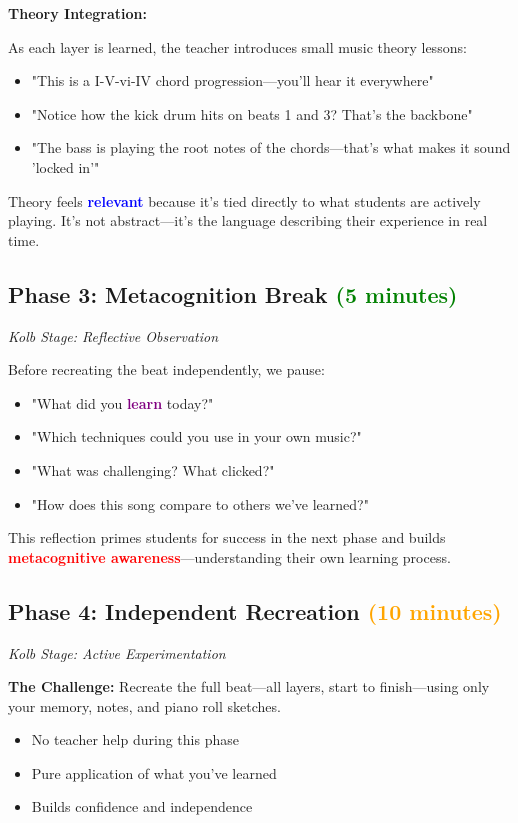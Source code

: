 \documentclass[11pt,letterpaper]{article}
\newcommand{\purple}[1]{\textcolor{purple}{\textbf{#1}}}
\newcommand{\bluepurple}[1]{\textcolor{blue}{\textbf{#1}}}
\newcommand{\redtext}[1]{\textcolor{red}{\textbf{#1}}}
\begin{document}
\textbf{Theory Integration:}

As each layer is learned, the teacher introduces small music theory lessons:
\begin{itemize}[leftmargin=*]
\item "This is a I-V-vi-IV chord progression—you'll hear it everywhere"
\item "Notice how the kick drum hits on beats 1 and 3? That's the backbone"
\item "The bass is playing the root notes of the chords—that's what makes it sound 'locked in'"
\end{itemize}

Theory feels \bluepurple{relevant} because it's tied directly to what students are actively playing. It's not abstract—it's the language describing their experience in real time.

\subsection*{Phase 3: Metacognition Break \texorpdfstring{\textcolor{green}{(5 minutes)}}{(5 minutes)}}
\textit{Kolb Stage: Reflective Observation}

Before recreating the beat independently, we pause:

\begin{itemize}[leftmargin=*]
\item "What did you \purple{learn} today?"
\item "Which techniques could you use in your own music?"
\item "What was challenging? What clicked?"
\item "How does this song compare to others we've learned?"
\end{itemize}

This reflection primes students for success in the next phase and builds \redtext{metacognitive awareness}—understanding their own learning process.

\subsection*{Phase 4: Independent Recreation \texorpdfstring{\textcolor{orange}{(10 minutes)}}{(10 minutes)}}
\textit{Kolb Stage: Active Experimentation}

\textbf{The Challenge:} Recreate the full beat—all layers, start to finish—using only your memory, notes, and piano roll sketches.

\begin{itemize}[leftmargin=*]
\item No teacher help during this phase
\item Pure application of what you've learned
\item Builds confidence and independence
\end{itemize}
\end{document}
